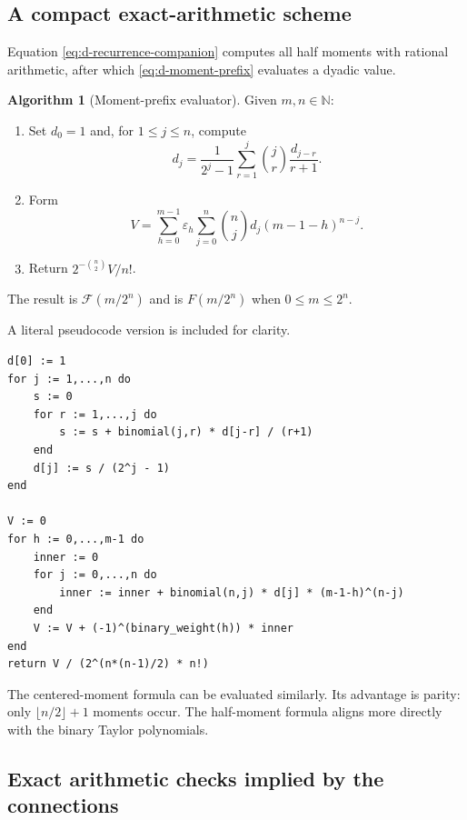 \documentclass[11pt,oneside]{article}
\theoremstyle{definition}
\newtheorem{algorithm}[theorem]{Algorithm}
\theoremstyle{remark}
\newcommand{\N}{\mathbb N}
\newcommand{\tm}{\varepsilon}
\begin{document}
\subsection{A compact exact-arithmetic scheme}

Equation \eqref{eq:d-recurrence-companion} computes all half moments with rational arithmetic,
after which \eqref{eq:d-moment-prefix} evaluates a dyadic value.

\begin{algorithm}[Moment-prefix evaluator]
\label{alg:moment-prefix}
Given $m,n\in\N$:
\begin{enumerate}
\item Set $d_0=1$ and, for $1\le j\le n$, compute
\[
 d_j=\frac1{2^j-1}\sum_{r=1}^{j}\binom jr\frac{d_{j-r}}{r+1}.
\]
\item Form
\[
 V=\sum_{h=0}^{m-1}\tm_h
   \sum_{j=0}^{n}\binom njd_j(m-1-h)^{n-j}.
\]
\item Return $2^{-\binom n2}V/n!$.
\end{enumerate}
The result is $\mathcal F(m/2^n)$ and is $F(m/2^n)$ when $0\le m\le2^n$.
\end{algorithm}

A literal pseudocode version is included for clarity.

\begin{lstlisting}[style=pseudo,caption={Exact dyadic evaluation from half moments.}]
d[0] := 1
for j := 1,...,n do
    s := 0
    for r := 1,...,j do
        s := s + binomial(j,r) * d[j-r] / (r+1)
    end
    d[j] := s / (2^j - 1)
end

V := 0
for h := 0,...,m-1 do
    inner := 0
    for j := 0,...,n do
        inner := inner + binomial(n,j) * d[j] * (m-1-h)^(n-j)
    end
    V := V + (-1)^(binary_weight(h)) * inner
end
return V / (2^(n*(n-1)/2) * n!)
\end{lstlisting}

The centered-moment formula can be evaluated similarly.  Its advantage is parity: only
$\lfloor n/2\rfloor+1$ moments occur.  The half-moment formula aligns more directly with the
binary Taylor polynomials.

\subsection{Exact arithmetic checks implied by the connections}
\end{document}
